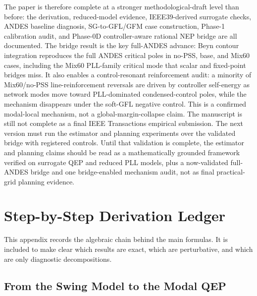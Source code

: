 \documentclass[journal]{IEEEtran}
\begin{document}
The paper is therefore complete at a stronger methodological-draft level than before: the derivation, reduced-model evidence, IEEE39-derived surrogate checks, ANDES baseline diagnosis, SG-to-GFL/GFM case construction, Phase-1 calibration audit, and Phase-0D controller-aware rational NEP bridge are all documented. The bridge result is the key full-ANDES advance: Beyn contour integration reproduces the full ANDES critical poles in no-PSS, base, and Mix60 cases, including the Mix60 PLL-family critical mode that scalar and fixed-point bridges miss. It also enables a control-resonant reinforcement audit: a minority of Mix60/no-PSS line-reinforcement reversals are driven by controller self-energy as network modes move toward PLL-dominated condensed-control poles, while the mechanism disappears under the soft-GFL negative control. This is a confirmed modal-local mechanism, not a global-margin-collapse claim. The manuscript is still not complete as a final IEEE Transactions empirical submission. The next version must run the estimator and planning experiments over the validated bridge with registered controls. Until that validation is complete, the estimator and planning claims should be read as a mathematically grounded framework verified on surrogate QEP and reduced PLL models, plus a now-validated full-ANDES bridge and one bridge-enabled mechanism audit, not as final practical-grid planning evidence.

\appendices

\section{Step-by-Step Derivation Ledger}
\label{app:derivationledger}

This appendix records the algebraic chain behind the main formulas. It is included to make clear which results are exact, which are perturbative, and which are only diagnostic decompositions.

\subsection{From the Swing Model to the Modal QEP}
\end{document}

